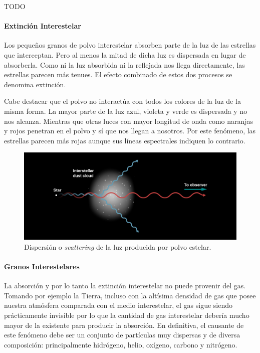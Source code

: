 \documentclass{tufte-handout}
\begin{document}
TODO

\paragraph{Extinción Interestelar}

Los pequeños granos de polvo interestelar absorben parte de la luz de las estrellas que interceptan. Pero al menos la mitad de dicha luz es dispersada en lugar de absorberla. Como ni la luz absorbida ni la reflejada nos llega directamente, las estrellas parecen más tenues. El efecto combinado de estos dos procesos se denomina extinción.

Cabe destacar que el polvo no interactúa con todos los colores de la luz de la misma forma. La mayor parte de la luz azul, violeta y verde es dispersada y no nos alcanza. Mientras que otras luces con mayor longitud de onda como naranjas y rojos penetran en el polvo y sí que nos llegan a nosotros. Por este fenómeno, las estrellas parecen más rojas aunque sus líneas espectrales indiquen lo contrario.

\begin{figure}
  \includegraphics[width=\linewidth]{img/scatter}
  \caption{Dispersión o \emph{scattering} de la luz producida por polvo estelar.}
\end{figure}

\paragraph{Granos Interestelares}

La absorción y por lo tanto la extinción interestelar no puede provenir del gas. Tomando por ejemplo la Tierra, incluso con la altísima densidad de gas que posee nuestra atmósfera comparada con el medio interestelar, el gas sigue siendo prácticamente invisible por lo que la cantidad de gas interestelar debería mucho mayor de la existente para producir la absorción. En definitiva, el causante de este fenómeno debe ser un conjunto de partículas muy dispersas y de diversa composición: principalmente hidrógeno, helio, oxígeno, carbono y nitrógeno.
\end{document}
